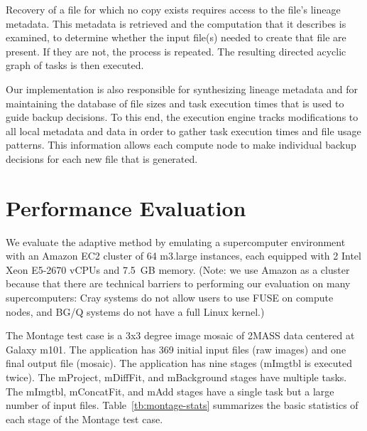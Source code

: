 \documentclass{sig-alternate}
\newcommand{\katznote}[1]{ {\textcolor{blue}    { ***Dan:      #1 }}}
\newcommand{\zhaonote}[1]{{\textcolor{cyan}    { ***Zhao:      #1 }}}
\newcommand{\katznote}[1]{}
\newcommand{\zhaonote}[1]{}
\begin{document}
Recovery of a file for which no copy exists requires access to the file's lineage metadata.
This metadata is retrieved and the computation that it describes is examined, to
determine whether the input file(s) needed to create that file are present. If they are not, the process is repeated.
The resulting directed acyclic graph of tasks is then executed.

Our implementation is also responsible for synthesizing lineage metadata and for
maintaining the database of file sizes and task execution times that is
used to guide backup decisions. To this end, the execution engine tracks modifications to all
local metadata and data
in order to gather task execution times and file usage patterns.
This information allows each compute node to make individual backup decisions for each new
file that is generated.



\section{Performance Evaluation}
\label{sec:Perf}
We evaluate the adaptive method by emulating a supercomputer environment with an Amazon EC2 cluster of 64 m3.large instances, each equipped with 2 Intel Xeon E5-2670 vCPUs and 7.5~GB memory.  (Note: we use Amazon as a cluster because that there are technical barriers to performing our evaluation on many supercomputers: Cray systems do not allow users to use FUSE on compute nodes, and BG/Q systems do not have a full Linux kernel.)

The Montage test case is a 3x3 degree image mosaic of 2MASS data centered at Galaxy m101. 
The application has 369 initial input files (raw images) and one final output file (mosaic). 
The application has nine stages (mImgtbl is executed twice). 
The mProject, mDiffFit, and mBackground stages have multiple tasks. 
The mImgtbl, mConcatFit, and mAdd stages have a single task but a large number of input files. 
Table~\ref{tb:montage-stats} summarizes the basic statistics of each stage of the Montage test case.
\end{document}

